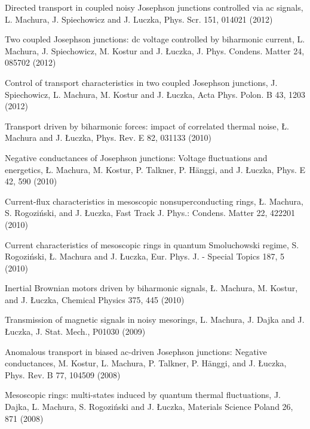 \begin{etaremune}
\item Directed transport in coupled noisy Josephson junctions controlled via ac signals, L. Machura, J. Spiechowicz and J. Luczka, Phys. Scr. 151,  014021 (2012) 

\item Two coupled Josephson junctions: dc voltage controlled by biharmonic current, L. Machura, J. Spiechowicz, M. Kostur and J. Łuczka, J. Phys. Condens. Matter 24,  085702 (2012)

\item Control of transport characteristics in two coupled Josephson junctions, J. Spiechowicz, L. Machura, M. Kostur and J. Łuczka, Acta Phys. Polon. B 43,  1203 (2012) 

\item Transport driven by biharmonic forces: impact of correlated thermal noise, Ł. Machura and J. Łuczka, Phys. Rev. E 82,  031133 (2010)

\item Negative conductances of Josephson junctions: Voltage fluctuations and energetics, Ł. Machura, M. Kostur, P. Talkner, P. Hänggi, and J. Łuczka, Phys. E 42,  590 (2010)

\item Current-flux characteristics in mesoscopic nonsuperconducting rings, Ł. Machura, S. Rogoziński, and J. Łuczka, Fast Track J. Phys.: Condens. Matter 22,  422201 (2010)

\item Current characteristics of mesoscopic rings in quantum Smoluchowski regime, S. Rogoziński, Ł. Machura and J. Łuczka, Eur. Phys. J. - Special Topics 187,  5 (2010) 

\item Inertial Brownian motors driven by biharmonic signals, Ł. Machura, M. Kostur, and J. Łuczka, Chemical Physics 375,  445 (2010)

\item Transmission of magnetic signals in noisy mesorings, L. Machura, J. Dajka and J. Łuczka, J. Stat. Mech.,  P01030 (2009)

\item Anomalous transport in biased ac-driven Josephson junctions: Negative conductances, M. Kostur, L. Machura, P. Talkner, P. Hänggi, and J. Łuczka, Phys. Rev. B 77,  104509 (2008) 

\item Mesoscopic rings: multi-states induced by quantum thermal fluctuations, J. Dajka, L. Machura, S. Rogoziński and J. Łuczka, Materials Science Poland 26,  871 (2008)


\end{etaremune}
